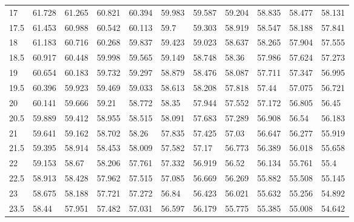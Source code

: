 \begin{bibunit}
\begin{table}[]
\begin{tabular}{lllllllllll}
			17   & 61.728 & 61.265 & 60.821 & 60.394 & 59.983 & 59.587 & 59.204 & 58.835 & 58.477 & 58.131 \\
			17.5 & 61.453 & 60.988 & 60.542 & 60.113 & 59.7   & 59.303 & 58.919 & 58.547 & 58.188 & 57.841 \\
			18   & 61.183 & 60.716 & 60.268 & 59.837 & 59.423 & 59.023 & 58.637 & 58.265 & 57.904 & 57.555 \\
			18.5 & 60.917 & 60.448 & 59.998 & 59.565 & 59.149 & 58.748 & 58.36  & 57.986 & 57.624 & 57.273 \\
			19   & 60.654 & 60.183 & 59.732 & 59.297 & 58.879 & 58.476 & 58.087 & 57.711 & 57.347 & 56.995 \\
			19.5 & 60.396 & 59.923 & 59.469 & 59.033 & 58.613 & 58.208 & 57.818 & 57.44  & 57.075 & 56.721 \\
			20   & 60.141 & 59.666 & 59.21  & 58.772 & 58.35  & 57.944 & 57.552 & 57.172 & 56.805 & 56.45  \\
			20.5 & 59.889 & 59.412 & 58.955 & 58.515 & 58.091 & 57.683 & 57.289 & 56.908 & 56.54  & 56.183 \\
			21   & 59.641 & 59.162 & 58.702 & 58.26  & 57.835 & 57.425 & 57.03  & 56.647 & 56.277 & 55.919 \\
			21.5 & 59.395 & 58.914 & 58.453 & 58.009 & 57.582 & 57.17  & 56.773 & 56.389 & 56.018 & 55.658 \\
			22   & 59.153 & 58.67  & 58.206 & 57.761 & 57.332 & 56.919 & 56.52  & 56.134 & 55.761 & 55.4   \\
			22.5 & 58.913 & 58.428 & 57.962 & 57.515 & 57.085 & 56.669 & 56.269 & 55.882 & 55.508 & 55.145 \\
			23   & 58.675 & 58.188 & 57.721 & 57.272 & 56.84  & 56.423 & 56.021 & 55.632 & 55.256 & 54.892 \\
			23.5 & 58.44  & 57.951 & 57.482 & 57.031 & 56.597 & 56.179 & 55.775 & 55.385 & 55.008 & 54.642 \\
		\midrule
	\end{tabular}
\end{table}


\end{bibunit}
